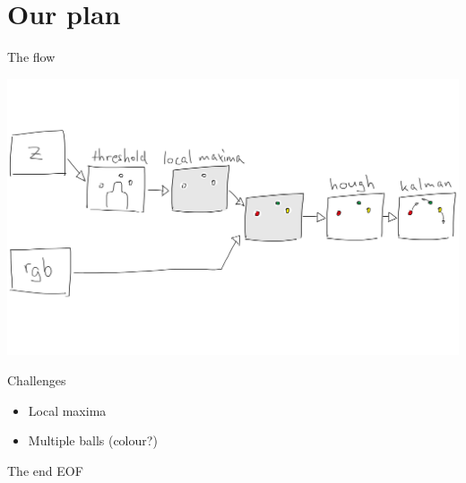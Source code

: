 \documentclass{beamer}
\begin{document}
\section{Our plan}
\begin{frame}{The flow}
\begin{center}\includegraphics[scale=0.1045]{img/flowchart.png}\end{center}
\end{frame}

\begin{frame}{Challenges}
\begin{itemize}
	\item Local maxima
	\item Multiple balls (colour?)
\end{itemize}
\end{frame}

\begin{frame}{The end}
EOF
\end{frame}
\end{document}
